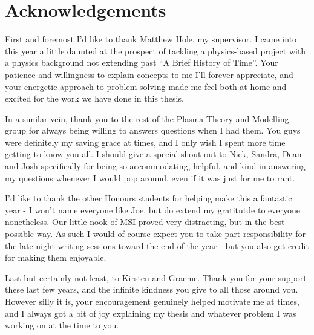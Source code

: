 
\chapter*{Acknowledgements}\label{acknowledgements}


First and foremost I'd like to thank Matthew Hole, my supervisor. I came 
into this year a little daunted at the prospect of tackling a physics-based 
project with a physics background not extending past ``A Brief History of Time''.
Your patience and willingness to explain concepts to me I'll forever appreciate, 
and your energetic approach to problem solving made me feel both at home and excited 
for the work we have done in this thesis. 

In a similar vein, thank you to the rest of the Plasma Theory and Modelling group for always being 
willing to answers questions when I had them. You guys were definitely my saving grace 
at times, and I only wish I spent more time getting to know you all. I should give 
a special shout out to Nick, Sandra, Dean and Josh specifically for being so 
accommodating, helpful, and kind in answering my questions whenever I would pop around, 
even if it was just for me to rant.

I'd like to thank the other Honours students for helping make this a fantastic 
year - I won't name everyone like Joe, but do extend my gratitutde to everyone 
nonetheless. Our little nook of MSI proved very distracting, but in the best possible 
way. As such I would of course expect you to take part responsibility for the late night 
writing sessions toward the end of the year - but you also get 
credit for making them enjoyable.

Last but certainly not least, to Kirsten and Graeme. Thank you for your support these last 
few years, and the infinite kindness you give to all those around you. However silly it is, 
your encouragement genuinely helped motivate me at times, and I always got a bit of joy 
explaining my thesis and whatever problem I was working on at the time to you.